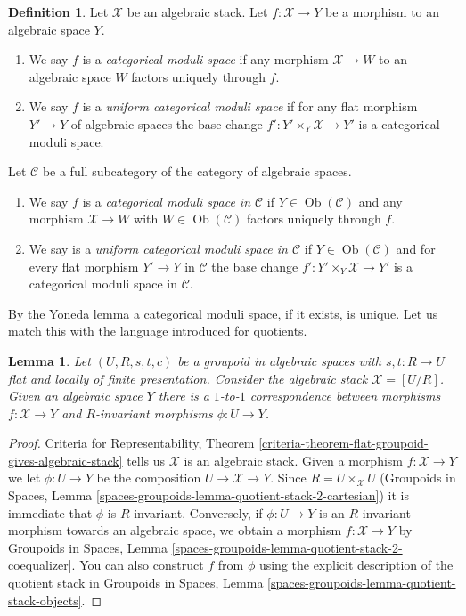 \documentclass[10pt,a4paper]{amsart}
\theoremstyle{plain}
\newtheorem{lemma}[subsection]{Lemma}
\theoremstyle{definition}
\newtheorem{definition}[subsection]{Definition}
\theoremstyle{remark}
\numberwithin{equation}{subsection}
\def\Ob{\mathop{\mathrm{Ob}}\nolimits}
\begin{document}
\begin{definition}
\label{definition-categorical-quotient}
Let $\mathcal{X}$ be an algebraic stack. Let
$f : \mathcal{X} \to Y$ be a morphism to an algebraic space $Y$.
\begin{enumerate}
\item We say $f$ is a {\it categorical moduli space} if any morphism
$\mathcal{X} \to W$ to an algebraic space $W$ factors uniquely through $f$.
\item We say $f$ is a {\it uniform categorical moduli space}
if for any flat morphism $Y' \to Y$ of algebraic spaces the base change
$f' : Y' \times_Y \mathcal{X} \to Y'$ is a categorical moduli space.
\end{enumerate}
Let $\mathcal{C}$ be a full subcategory of the category of algebraic
spaces.
\begin{enumerate}
\item[(3)] We say $f$ is a {\it categorical moduli space in $\mathcal{C}$}
if $Y \in \Ob(\mathcal{C})$ and any morphism $\mathcal{X} \to W$ with
$W \in \Ob(\mathcal{C})$ factors uniquely through $f$.
\item[(4)] We say is a {\it uniform categorical moduli space in $\mathcal{C}$}
if $Y \in \Ob(\mathcal{C})$ and for every flat morphism $Y' \to Y$ in
$\mathcal{C}$ the base change $f' : Y' \times_Y \mathcal{X} \to Y'$ is a
categorical moduli space in $\mathcal{C}$.
\end{enumerate}
\end{definition}

\noindent
By the Yoneda lemma a categorical moduli space, if it exists, is unique.
Let us match this with the language introduced for quotients.

\begin{lemma}
\label{lemma-quotient-compare}
Let $(U, R, s, t, c)$ be a groupoid in algebraic spaces with
$s, t : R \to U$ flat and locally of finite presentation.
Consider the algebraic stack $\mathcal{X} = [U/R]$.
Given an algebraic space $Y$ there is a $1$-to-$1$ correspondence between
morphisms $f : \mathcal{X} \to Y$ and $R$-invariant morphisms
$\phi : U \to Y$.
\end{lemma}

\begin{proof}
Criteria for Representability, Theorem
\ref{criteria-theorem-flat-groupoid-gives-algebraic-stack}
tells us $\mathcal{X}$ is an algebraic stack.
Given a morphism $f : \mathcal{X} \to Y$ we let $\phi : U \to Y$ be
the composition $U \to \mathcal{X} \to Y$. Since $R = U \times_\mathcal{X} U$
(Groupoids in Spaces, Lemma
\ref{spaces-groupoids-lemma-quotient-stack-2-cartesian})
it is immediate that $\phi$ is $R$-invariant.
Conversely, if $\phi : U \to Y$ is an $R$-invariant morphism towards
an algebraic space, we obtain a morphism
$f : \mathcal{X} \to Y$ by
Groupoids in Spaces, Lemma
\ref{spaces-groupoids-lemma-quotient-stack-2-coequalizer}.
You can also construct $f$ from $\phi$ using the explicit description of
the quotient stack in
Groupoids in Spaces, Lemma
\ref{spaces-groupoids-lemma-quotient-stack-objects}.
\end{proof}
\end{document}
